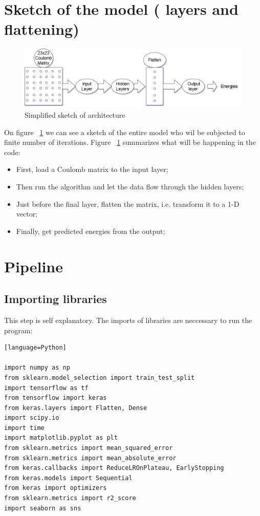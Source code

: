 \documentclass[a4paper,oneside,openright,11pt]{book}
\begin{document}
\section{Sketch of the model ( layers and flattening)}

\begin{figure}[h!]
\centering
\includegraphics[scale=0.4]{DocumentFigures/MyFigures/FlattenOperatioNNscheme.png}
\caption{Simplified sketch of architecture}
\label{fig:sketch}
\end{figure}

On figure ~\ref{fig:sketch} we can see a sketch of the entire model who wil be subjected to finite number of iterations. Figure ~\ref{fig:sketch} summarizes what will be happening in the code:

\begin{itemize}
    \item First, load a Coulomb matrix to the input layer;
    \item Then run the algorithm and let the data flow through the hidden layers;
    \item Just before the final layer, flatten the matrix, i.e. transform it to a 1-D vector;
    \item Finally, get predicted energies from the output;
\end{itemize}

\section{Pipeline}

\subsection{Importing libraries}

This step is self explanatory. The imports of libraries are neccessary to run the program:

\begin{verbatim}[language=Python]

import numpy as np
from sklearn.model_selection import train_test_split
import tensorflow as tf
from tensorflow import keras
from keras.layers import Flatten, Dense
import scipy.io
import time
import matplotlib.pyplot as plt
from sklearn.metrics import mean_squared_error
from sklearn.metrics import mean_absolute_error
from keras.callbacks import ReduceLROnPlateau, EarlyStopping
from keras.models import Sequential
from keras import optimizers
from sklearn.metrics import r2_score
import seaborn as sns


\end{verbatim}
\end{document}

